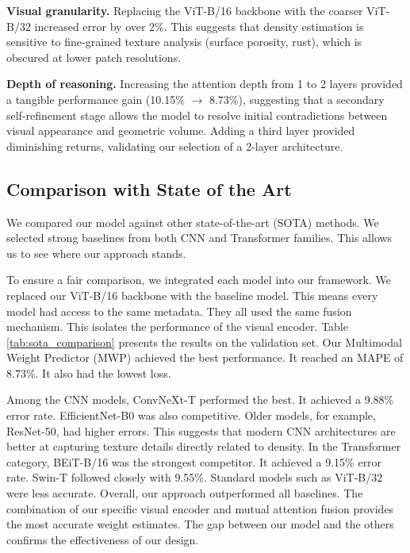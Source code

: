 \documentclass[journal,twoside,web]{ieeecolor}
\begin{document}
\noindent \textbf{Visual granularity.} Replacing the ViT-B/16 backbone with the coarser ViT-B/32 increased error by over 2\%. This suggests that density estimation is sensitive to fine-grained texture analysis (surface porosity, rust), which is obscured at lower patch resolutions.

\noindent \textbf{Depth of reasoning.} Increasing the attention depth from 1 to 2 layers provided a tangible performance gain (10.15\% $\to$ 8.73\%), suggesting that a secondary self-refinement stage allows the model to resolve initial contradictions between visual appearance and geometric volume. Adding a third layer provided diminishing returns, validating our selection of a 2-layer architecture.

\subsection{Comparison with State of the Art}
We compared our model against other state-of-the-art (SOTA) methods. We selected strong baselines from both CNN and Transformer families. This allows us to see where our approach stands.

To ensure a fair comparison, we integrated each model into our framework. We replaced our ViT-B/16 backbone with the baseline model. This means every model had access to the same metadata. They all used the same fusion mechanism. This isolates the performance of the visual encoder. Table \ref{tab:sota_comparison} presents the results on the validation set. Our Multimodal Weight Predictor (MWP) achieved the best performance. It reached an MAPE of 8.73\%. It also had the lowest loss.

Among the CNN models, ConvNeXt-T performed the best. It achieved a 9.88\% error rate. EfficientNet-B0 was also competitive. Older models, for example, ResNet-50, had higher errors. This suggests that modern CNN architectures are better at capturing texture details directly related to density. In the Transformer category, BEiT-B/16 was the strongest competitor. It achieved a 9.15\% error rate. Swin-T followed closely with 9.55\%. Standard models such as ViT-B/32 were less accurate. Overall, our approach outperformed all baselines. The combination of our specific visual encoder and mutual attention fusion provides the most accurate weight estimates. The gap between our model and the others confirms the effectiveness of our design.
\end{document}
